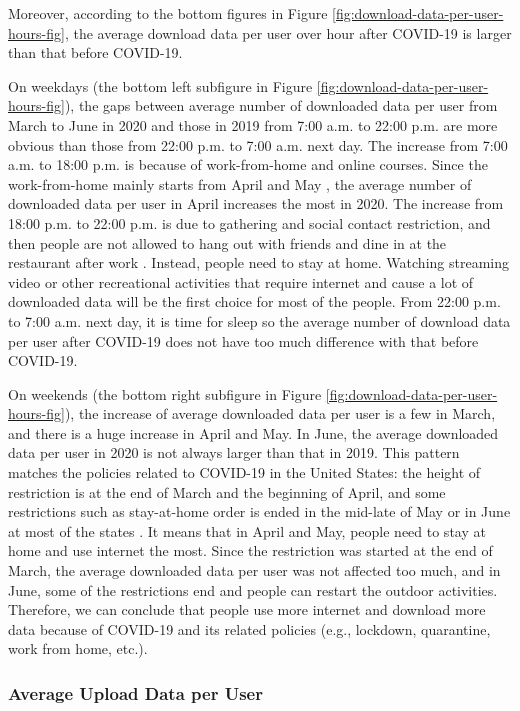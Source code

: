 Moreover, according to the bottom figures in Figure \ref{fig:download-data-per-user-hours-fig}, the average download data per user over hour after COVID-19 is larger than that before COVID-19. 

On weekdays (the bottom left subfigure in Figure \ref{fig:download-data-per-user-hours-fig}), the gaps between average number of downloaded data per user from March to June in 2020 and those in 2019 from 7:00 a.m. to 22:00 p.m. are more obvious than those from 22:00 p.m. to 7:00 a.m. next day. The increase from 7:00 a.m. to 18:00 p.m. is because of work-from-home and online courses. Since the work-from-home mainly starts from April and May \cite{remotework}, the average number of downloaded data per user in April increases the most in 2020. The increase from 18:00 p.m. to 22:00 p.m. is due to gathering and social contact restriction, and then people are not allowed to hang out with friends and dine in at the restaurant after work \cite{lockdownsguide}. Instead, people need to stay at home. Watching streaming video or other recreational activities that require internet and cause a lot of downloaded data will be the first choice for most of the people. From 22:00 p.m. to 7:00 a.m. next day, it is time for sleep so the average number of download data per user after COVID-19 does not have too much difference with that before COVID-19. 

On weekends (the bottom right subfigure in Figure \ref{fig:download-data-per-user-hours-fig}), the increase of average downloaded data per user is a few in March, and there is a huge increase in April and May. In June, the average downloaded data per user in 2020 is not always larger than that in 2019. This pattern matches the policies related to COVID-19 in the United States: the height of restriction is at the end of March and the beginning of April, and some restrictions such as stay-at-home order is ended in the mid-late of May or in June at most of the states \cite{covid19restriction}. It means that in April and May, people need to stay at home and use internet the most. Since the restriction was started at the end of March, the average downloaded data per user was not affected too much, and in June, some of the restrictions end and people can restart the outdoor activities. Therefore, we can conclude that people use more internet and download more data because of COVID-19 and its related policies (e.g., lockdown, quarantine, work from home, etc.). 

\subsubsection{Average Upload Data per User}
\label{sec:upload-data-per-user-over-hours}

